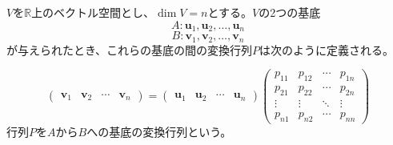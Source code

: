\documentclass{jlreq}
\begin{document}
\begin{definitionbox}[基底の変換行列]
  $V$を$\mathbb{R}$上のベクトル空間とし、$\dim V = n$とする。$V$の2つの基底
  \begin{equation*}
   A:  \boldsymbol{u}_1, \boldsymbol{u}_2, \ldots, \boldsymbol{u}_n
  \end{equation*}
  \begin{equation*}
    B: \boldsymbol{v}_1, \boldsymbol{v}_2, \ldots, \boldsymbol{v}_n
  \end{equation*}
  が与えられたとき、これらの基底の間の変換行列$P$は次のように定義される。

  \begin{equation*}
    \begin{pmatrix}
      \boldsymbol{v}_1 & \boldsymbol{v}_2 & \cdots & \boldsymbol{v}_n
    \end{pmatrix} = 
    \begin{pmatrix}
      \boldsymbol{u}_1 & \boldsymbol{u}_2 & \cdots & \boldsymbol{u}_n
    \end{pmatrix}
    \begin{pmatrix}
      p_{11} & p_{12} & \cdots & p_{1n} \\
      p_{21} & p_{22} & \cdots & p_{2n} \\
      \vdots & \vdots & \ddots & \vdots \\
      p_{n1} & p_{n2} & \cdots & p_{nn}
    \end{pmatrix}
  \end{equation*}
  行列$P$を$A$から$B$への基底の変換行列という。
\end{definitionbox}
\end{document}
